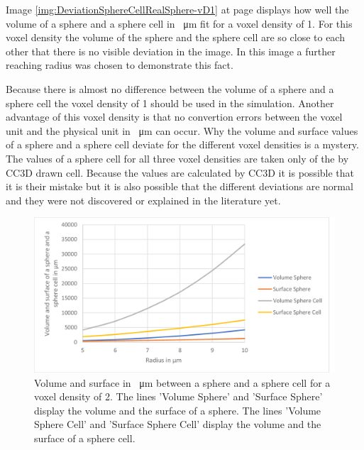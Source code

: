 Image \ref{img:DeviationSphereCellRealSphere-vD1} at page \pageref{img:DeviationSphereCellRealSphere-vD1} displays how well the volume of a sphere and a sphere cell in \SI{}{\micro\metre} fit for a voxel density of 1. For this voxel density the volume of the sphere and the sphere cell are so close to each other that there is no visible deviation in the image. In this image a further reaching radius was chosen to demonstrate this fact.

Because there is almost no difference between the volume of a sphere and a sphere cell the voxel density of 1 should be used in the simulation. Another advantage of this voxel density is that no convertion errors between the voxel unit and the physical unit in \SI{}{\micro\metre} can occur. \newline
Why the volume and surface values of a sphere and a sphere cell deviate for the different voxel densities is a mystery. The values of a sphere cell for all three voxel densities are taken only of the by \ac{CC3D} drawn cell. Because the values are calculated by \ac{CC3D} it is possible that it is their mistake but it is also possible that the different deviations are normal and they were not discovered or explained in the literature yet.
\begin{figure}[ht]
	\center
	\includegraphics[scale=0.3]{figures/DeviationSphereToPixelSphere-vD2.png}
	\caption[Volume and surface in \SI{}{\micro\metre} between a sphere and a sphere cell for a voxel density of 2]{Volume and surface in \SI{}{\micro\metre} between a sphere and a sphere cell for a voxel density of 2. The lines 'Volume Sphere' and 'Surface Sphere' display the volume and the surface of a sphere. The lines 'Volume Sphere Cell' and 'Surface Sphere Cell' display the volume and the surface of a sphere cell.}
	\label{img:DeviationSphereCellRealSphere-vD2}
\end{figure}

